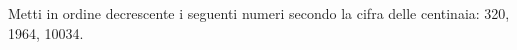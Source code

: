 \item Metti in ordine decrescente i seguenti numeri secondo la cifra delle centinaia: 320, 1964, 10034. 